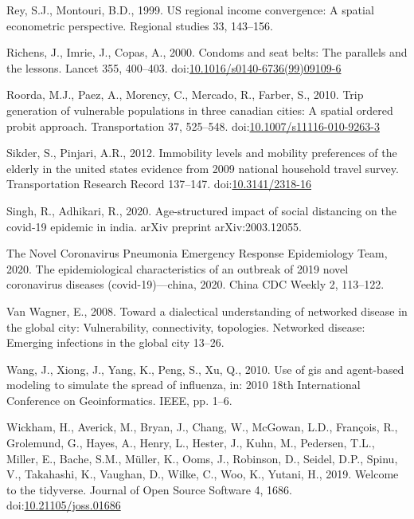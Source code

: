\documentclass[]{elsarticle} %
\begin{document}
\leavevmode\hypertarget{ref-Rey1999us}{}%
Rey, S.J., Montouri, B.D., 1999. US regional income convergence: A
spatial econometric perspective. Regional studies 33, 143--156.

\leavevmode\hypertarget{ref-Richens2000risk}{}%
Richens, J., Imrie, J., Copas, A., 2000. Condoms and seat belts: The
parallels and the lessons. Lancet 355, 400--403.
doi:\href{https://doi.org/10.1016/s0140-6736(99)09109-6}{10.1016/s0140-6736(99)09109-6}

\leavevmode\hypertarget{ref-Roorda2010trip}{}%
Roorda, M.J., Paez, A., Morency, C., Mercado, R., Farber, S., 2010. Trip
generation of vulnerable populations in three canadian cities: A spatial
ordered probit approach. Transportation 37, 525--548.
doi:\href{https://doi.org/10.1007/s11116-010-9263-3}{10.1007/s11116-010-9263-3}

\leavevmode\hypertarget{ref-Sikder2012immobility}{}%
Sikder, S., Pinjari, A.R., 2012. Immobility levels and mobility
preferences of the elderly in the united states evidence from 2009
national household travel survey. Transportation Research Record
137--147. doi:\href{https://doi.org/10.3141/2318-16}{10.3141/2318-16}

\leavevmode\hypertarget{ref-Singh2020age}{}%
Singh, R., Adhikari, R., 2020. Age-structured impact of social
distancing on the covid-19 epidemic in india. arXiv preprint
arXiv:2003.12055.

\leavevmode\hypertarget{ref-Novel2020epidemiological}{}%
The Novel Coronavirus Pneumonia Emergency Response Epidemiology Team,
2020. The epidemiological characteristics of an outbreak of 2019 novel
coronavirus diseases (covid-19)---china, 2020. China CDC Weekly 2,
113--122.

\leavevmode\hypertarget{ref-vanWagner2008toward}{}%
Van Wagner, E., 2008. Toward a dialectical understanding of networked
disease in the global city: Vulnerability, connectivity, topologies.
Networked disease: Emerging infections in the global city 13--26.

\leavevmode\hypertarget{ref-Wang2010gis}{}%
Wang, J., Xiong, J., Yang, K., Peng, S., Xu, Q., 2010. Use of gis and
agent-based modeling to simulate the spread of influenza, in: 2010 18th
International Conference on Geoinformatics. IEEE, pp. 1--6.

\leavevmode\hypertarget{ref-Wickham2019}{}%
Wickham, H., Averick, M., Bryan, J., Chang, W., McGowan, L.D., François,
R., Grolemund, G., Hayes, A., Henry, L., Hester, J., Kuhn, M., Pedersen,
T.L., Miller, E., Bache, S.M., Müller, K., Ooms, J., Robinson, D.,
Seidel, D.P., Spinu, V., Takahashi, K., Vaughan, D., Wilke, C., Woo, K.,
Yutani, H., 2019. Welcome to the tidyverse. Journal of Open Source
Software 4, 1686.
doi:\href{https://doi.org/10.21105/joss.01686}{10.21105/joss.01686}
\end{document}
